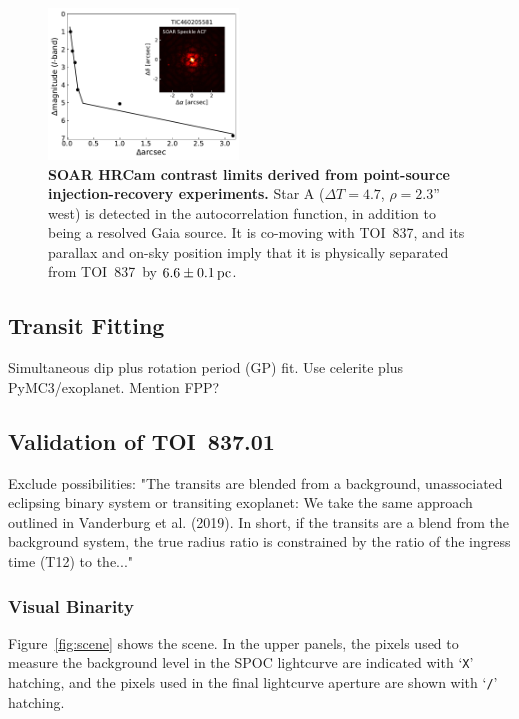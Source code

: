 \documentclass[12pt,twocolumn,tighten]{aastex62}
\newcommand{\tn}{TOI~837} %
\newcommand{\pn}{TOI~837.01} %
\begin{document}
\begin{figure}[t]
	\begin{center}
		\leavevmode
		\includegraphics[width=0.45\textwidth]{f4.pdf}
	\end{center}
	\vspace{-0.7cm}
	\caption{ 
		{\bf SOAR HRCam contrast limits derived from point-source
			injection-recovery experiments.} 
      Star A ($\Delta T=4.7$, $\rho=2.3$'' west) is detected in the
      autocorrelation function, in addition to being a resolved Gaia
      source.
      It is co-moving with \tn, and
      its parallax and on-sky position imply that
      it is physically separated from \tn\ by $6.6\pm 0.1\,{\rm pc}$.
		\label{fig:soar}
	}
\end{figure}



\subsection{Transit Fitting}
Simultaneous dip plus rotation period (GP) fit. Use celerite plus PyMC3/exoplanet.
Mention FPP?


\subsection{Validation of \pn}
\label{subsec:validation}

Exclude possibilities:
"The transits are blended from a background, unassociated eclipsing binary
system or transiting exoplanet: We take the same approach outlined in
Vanderburg et al. (2019). In short, if the transits are a blend from the
background system, the true radius ratio is constrained by the ratio of the
ingress time (T12) to the..."


\subsubsection{Visual Binarity}
Figure~\ref{fig:scene} shows the scene.
In the upper panels, the pixels used to measure the background level
in the SPOC lightcurve are indicated with `\texttt{X}' hatching, and
the pixels used in the final lightcurve aperture are shown with
`\texttt{/}' hatching.
\end{document}
